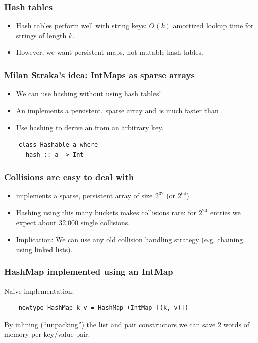 \documentclass[xetex,mathserif,serif]{beamer}
\newcommand{\code}[1]{\mbox{\texttt{\small{\color{CodeColor}{#1}}}}}
\begin{document}
\begin{frame}
  \frametitle{Hash tables}
  \begin{itemize}
  \item Hash tables perform well with string keys: $O(k)$ amortized
    lookup time for strings of length $k$.
  \item However, we want persistent maps, not mutable hash tables.
  \end{itemize}
\end{frame}

\begin{frame}[fragile]
  \frametitle{Milan Straka's idea: IntMaps as sparse arrays}
  \begin{itemize}
  \item We can use hashing without using hash tables!
  \item An \code{Data.IntMap} implements a persistent, sparse
    array and is much faster than \code{Data.Map}.
  \item Use hashing to derive an \code{Int} from an arbitrary
    key.
  \end{itemize}
  \begin{lstlisting}
    class Hashable a where
      hash :: a -> Int
  \end{lstlisting}
\end{frame}

\begin{frame}
  \frametitle{Collisions are easy to deal with}
  \begin{itemize}
  \item \code{IntMap} implements a sparse, persistent array of size
    $2^{32}$ (or $2^{64}$).
  \item Hashing using this many buckets makes collisions rare: for
    $2^{24}$ entries we expect about 32,000 single collisions.
  \item Implication: We can use any old collision handling strategy
    (e.g. chaining using linked lists).
  \end{itemize}
\end{frame}

\begin{frame}[fragile]
  \frametitle{HashMap implemented using an IntMap}

  Naive implementation:

  \begin{lstlisting}
    newtype HashMap k v = HashMap (IntMap [(k, v)])
  \end{lstlisting}

  By inlining (``unpacking'') the list and pair constructors we can
  save 2 words of memory per key/value pair.
\end{frame}
\end{document}
